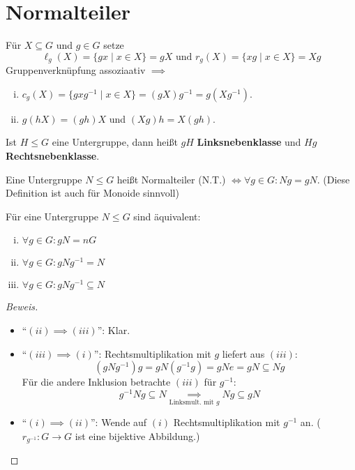 \documentclass[a4paper]{report}
\begin{document}
\section{Normalteiler}
\begin{nota*}
  Für $X \subseteq G$ und $g \in G$ setze $$\ell_{g}(X) = \{gx \mid x \in X\} = gX \text{ und } r_{g}(X) = \{xg \mid x \in X\} = Xg$$
  Gruppenverknüpfung assoziaativ $\implies$
  \begin{enumerate}[(i)]
    \item $c_{g}(X) = \{gxg^{-1} \mid x \in X\} = (gX)g^{-1} = g(Xg^{-1})$.
    \item $g(hX) = (gh)X$ und $(Xg)h = X(gh)$.
  \end{enumerate}
\end{nota*}

\begin{bem*} Ist $H \le G$ eine Untergruppe, dann heißt $gH$ \textbf{Linksnebenklasse} und $Hg$ \textbf{Rechtsnebenklasse}.
\end{bem*}

\begin{defi}
  Eine Untergruppe $N \le G$ heißt Normalteiler (N.T.) $\iff \forall g \in G : Ng = gN$. (Diese Definition ist auch für Monoide sinnvoll)
\end{defi}

\begin{lemm}
  Für eine Untergruppe $N \le G$ sind äquivalent:
  \begin{enumerate}[(i)]
    \item $\forall g \in G : gN = nG$
    \item $\forall g \in G : gNg^{-1} = N$
    \item $\forall g \in G : gNg^{-1} \subseteq N$
  \end{enumerate}
  \begin{proof}[Beweis]
\begin{itemize}
\item ``$(ii)\implies (iii)$'': Klar.
  \item ``$(iii)\implies (i)$'': Rechtsmultiplikation mit $g$ liefert aus $(iii)$:
        $$(gNg^{-1})g = gN(g^{-1}g) = gNe = gN \subseteq Ng$$
        Für die andere Inklusion betrachte $(iii)$ für $g^{-1}$:
        $$g^{-1}Ng \subseteq N \underset{\text{Linksmult. mit }g}\implies Ng \subseteq gN$$
\item ``$(i)\implies (ii)$'': Wende auf $(i)$ Rechtsmultiplikation mit $g^{-1}$ an. ($r_{g^{-1}}: G \to G$ ist eine bijektive Abbildung.)
\end{itemize}
  \end{proof}
\end{lemm}
\end{document}
